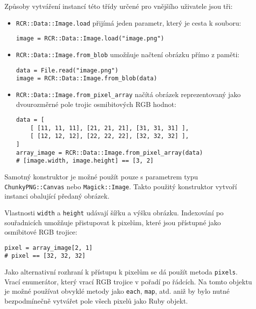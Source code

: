 \documentclass[a4paper]{article}
\begin{document}
Způsoby vytváření instancí této třídy určené pro vnějšího uživatele jsou tři:
\begin{itemize}
\item \texttt{RCR::Data::Image.load} přijímá jeden parametr, který je cesta k
souboru:
\begin{lstlisting}
image = RCR::Data::Image.load("image.png")
\end{lstlisting}
\item \texttt{RCR::Data::Image.from\_blob} umožňuje načtení obrázku přímo z
paměti:
\begin{lstlisting}
data = File.read("image.png")
image = RCR::Data::Image.from_blob(data)
\end{lstlisting}
\item \texttt{RCR::Data::Image.from\_pixel\_array} načítá obrázek reprezentovaný
jako dvourozměrné pole trojic osmibitových RGB hodnot:
\begin{lstlisting}
data = [
	[ [11, 11, 11], [21, 21, 21], [31, 31, 31] ],
	[ [12, 12, 12], [22, 22, 22], [32, 32, 32] ],
]
array_image = RCR::Data::Image.from_pixel_array(data)
# [image.width, image.height] == [3, 2]
\end{lstlisting}
\end{itemize}

Samotný konstruktor je možné použít pouze s parametrem typu
\texttt{ChunkyPNG::Canvas} nebo \texttt{Magick::Image}. Takto použitý
konstruktor vytvoří instanci obalující předaný obrázek.

Vlastnosti \texttt{width} a \texttt{height} udávají šířku a výšku obrázku.
Indexování po souřadnicích umožňuje přistupovat k pixelům, které jsou přístupné
jako osmibitové RGB trojice:
\begin{lstlisting}
pixel = array_image[2, 1]
# pixel == [32, 32, 32]
\end{lstlisting}

Jako alternativní rozhraní k přístupu k pixelům se dá použít metoda
\texttt{pixels}. Vrací enumerátor, který vrací RGB trojice v pořadí
po řádcích. Na tomto objektu je možné používat obvyklé metody jako
\texttt{each}, \texttt{map}, atd. aniž by bylo nutné bezpodmínečně
vytvářet pole všech pixelů jako Ruby objekt.

\end{document}
